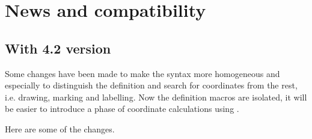 \section*{News and compatibility}

\subsection{With 4.2 version} %
\label{sub:with_4_2_version}

Some changes have been made to make the syntax more homogeneous and especially to distinguish the definition and search for coordinates from the rest, i.e. drawing, marking and labelling.
Now the definition macros are isolated, it will be easier to introduce a phase of coordinate calculations using .

Here are some of the changes. 
\vspace{1cm}
